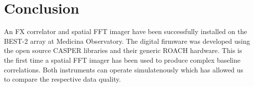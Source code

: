 \documentclass[useAMS,macros,usenatbib]{mn2e}
\begin{document}
%
%

\section{Conclusion}
\label{conclusion}

An FX correlator and spatial FFT imager have been successfully installed on the BEST-2 array at Medicina Observatory.
The digital firmware was developed using the open source CASPER libraries and their generic ROACH hardware.
This is the first time a spatial FFT imager has been used to produce complex baseline correlations.
Both instruments can operate simulatenously which has allowed us to compare the respective data quality.
\end{document}

